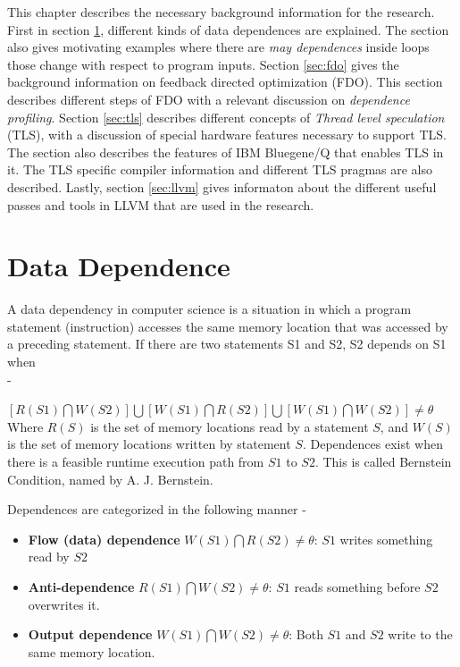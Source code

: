 \documentclass[10pt]{report}          %
\begin{document}
This chapter describes the necessary background information for the research.  First in section \ref{sec:data_dependence}, different kinds of data dependences are explained.  The section also gives motivating examples where there are \textit{may dependences} inside loops those change with respect to program inputs.  Section \ref{sec:fdo} gives the background information on feedback directed optimization (FDO).  This section describes different steps of FDO with a relevant discussion on \textit{dependence profiling}.  Section \ref{sec:tls} describes different concepts of \textit{Thread level speculation} (TLS), with  a discussion of special hardware features necessary to support TLS.  The section also describes the features of IBM Bluegene/Q that enables TLS in it.  The TLS specific compiler information and different TLS pragmas are also described.  Lastly, section \ref{sec:llvm} gives informaton about the different useful passes and tools in LLVM that are used in the research.

\section{Data Dependence}
\label{sec:data_dependence}
A data dependency in computer science is a situation in which a program statement (instruction) accesses the same memory location that was accessed by a preceding statement.  If there are two statements S1 and S2, S2 depends on S1 when \\- 

$[R(S1) \bigcap W(S2)] \bigcup  [W(S1) \bigcap R(S2)] \bigcup [W(S1) \bigcap W(S2)] \neq \theta $\\

Where $R(S)$ is the set of memory locations read by a statement $S$, and $W(S)$ is the set of memory locations written by statement $S$.  Dependences exist when there is a feasible runtime execution path from $S1$ to $S2$.  This is called Bernstein Condition, named by A. J. Bernstein. \cite{bernstein}

Dependences are categorized in the following manner - 

\begin{itemize}
\item \textbf{Flow (data) dependence} $W(S1) \bigcap R(S2) \neq \theta $:  $S1$ writes something read by $S2$
\item \textbf{Anti-dependence} $R(S1) \bigcap W(S2) \neq \theta $: $S1$ reads something before $S2$ overwrites it.
\item \textbf{Output dependence} $W(S1) \bigcap W(S2) \neq \theta$: Both $S1$ and $S2$ write to the same memory location.
\end{itemize}
\end{document}
